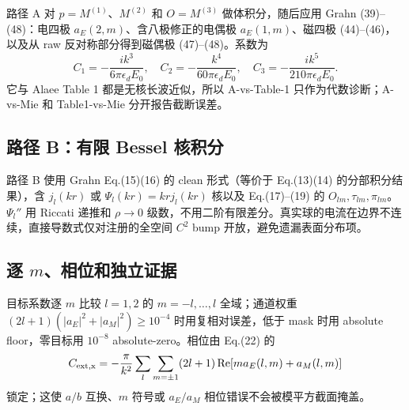 路径 A 对 $p=M^{(1)}$、$M^{(2)}$ 和 $O=M^{(3)}$ 做体积分，随后应用 Grahn (39)--(48)：电四极 $a_E(2,m)$、含八极修正的电偶极 $a_E(1,m)$、磁四极 (44)--(46)，以及从 raw 反对称部分得到磁偶极 (47)--(48)。系数为
\begin{equation}
 C_1=-\frac{ik^3}{6\pi\epsilon_dE_0},\quad C_2=-\frac{k^4}{60\pi\epsilon_dE_0},\quad C_3=-\frac{ik^5}{210\pi\epsilon_dE_0}.
\end{equation}
它与 Alaee Table 1 都是无核长波近似，所以 A-vs-Table-1 只作为代数诊断；A-vs-Mie 和 Table1-vs-Mie 分开报告截断误差。

\subsection{路径 B：有限 Bessel 核积分}

路径 B 使用 Grahn Eq.(15)(16) 的 clean 形式（等价于 Eq.(13)(14) 的分部积分结果），含 $j_l(kr)$ 或 $\Psi_l(kr)=krj_l(kr)$ 核以及 Eq.(17)--(19) 的 $O_{lm},\tau_{lm},\pi_{lm}$。$\Psi_l''$ 用 Riccati 递推和 $\rho\to0$ 级数，不用二阶有限差分。真实球的电流在边界不连续，直接导数式仅对注册的全空间 $C^2$ bump 开放，避免遗漏表面分布项。

\subsection{逐 $m$、相位和独立证据}

目标系数逐 $m$ 比较 $l=1,2$ 的 $m=-l,\ldots,l$ 全域；通道权重 $(2l+1)(|a_E|^2+|a_M|^2)\ge10^{-4}$ 时用复相对误差，低于 mask 时用 absolute floor，零目标用 $10^{-8}$ absolute-zero。相位由 Eq.(22) 的
\begin{equation}
 C_{\rm ext,x}=-\frac{\pi}{k^2}\sum_l\sum_{m=\pm1}(2l+1)\operatorname{Re}[m a_E(l,m)+a_M(l,m)]
\end{equation}
锁定；这使 $a/b$ 互换、$m$ 符号或 $a_E/a_M$ 相位错误不会被模平方截面掩盖。
